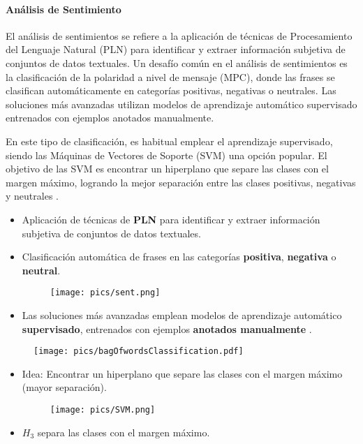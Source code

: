 \paragraph{Análisis de Sentimiento}

El análisis de sentimientos se refiere a la aplicación de técnicas de Procesamiento del Lenguaje Natural (PLN) para identificar y extraer información subjetiva de conjuntos de datos textuales. Un desafío común en el análisis de sentimientos es la clasificación de la polaridad a nivel de mensaje (MPC), donde las frases se clasifican automáticamente en categorías positivas, negativas o neutrales. Las soluciones más avanzadas utilizan modelos de aprendizaje automático supervisado entrenados con ejemplos anotados manualmente.

En este tipo de clasificación, es habitual emplear el aprendizaje supervisado, siendo las Máquinas de Vectores de Soporte (SVM) una opción popular. El objetivo de las SVM es encontrar un hiperplano que separe las clases con el margen máximo, logrando la mejor separación entre las clases positivas, negativas y neutrales \cite{jacobbook}.

\begin{itemize}
  \item Aplicación de técnicas de \textbf{PLN} para identificar y extraer información subjetiva de conjuntos de datos textuales.
  \item Clasificación automática de frases en las categorías \textcolor[rgb]{0.00,0.00,1.00}{\textbf{positiva}}, \textcolor[rgb]{1.00,0.00,0.00}{\textbf{negativa}} o \textcolor[rgb]{0.00,1.00,0.00}{\textbf{neutral}}.

     \begin{figure}[h]
        	\texttt{[image: pics/sent.png]}
        \end{figure}

  \item Las soluciones más avanzadas emplean modelos de aprendizaje automático \textbf{supervisado}, entrenados con ejemplos \textbf{anotados manualmente} \cite{Mohammad2013}.
\end{itemize}


\begin{figure}[h]
        	\texttt{[image: pics/bagOfwordsClassification.pdf]}
        \end{figure}


\begin{itemize}


\item Idea: Encontrar un hiperplano que separe las clases con el margen máximo (mayor separación).

     \begin{figure}[h]
        	\texttt{[image: pics/SVM.png]}
        \end{figure}

\item $H_3$ separa las clases con el margen máximo.

\end{itemize}


